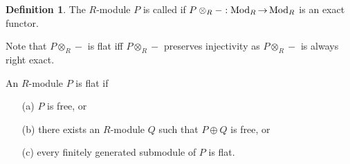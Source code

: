 \documentclass[11pt]{book}
\theoremstyle{definition}   \newtheorem{defn}[counter]{Definition} %
\DeclareMathOperator{\ra}{\rightarrow}   \DeclareMathOperator{\Poly}{\mathbf{P}}   \DeclareMathOperator{\spn}{\textnormal{span}}   \DeclareMathOperator{\aut}{\textnormal{Aut}}
\newcommand{\vs}{\vspace{8pt}}   \newcommand{\hs}{\hspace{8pt}}
\numberwithin{counter}{chapter}
\begin{document}
\vs

\begin{defn}
The $R$-module $P$ is called  if $P \otimes_R -: \tn{Mod}_R
\ra \tn{Mod}_R$ is an exact functor. 
\end{defn}

\vs

\begin{remark*}
Note that $P \otimes_R -$ is flat iff $P \otimes_R -$ preserves
injectivity as $P \otimes_R -$ is always right exact.
\end{remark*}

\vs

\begin{lemma}
An $R$-module $P$ is flat if
\begin{enumerate}
\item[(a)] $P$ is free, or
\item[(b)] there exists an $R$-module $Q$ such that $P \oplus Q$ is free, or
\item[(c)] every finitely generated submodule of $P$ is flat.
\end{enumerate}
\end{lemma}
\end{document}
